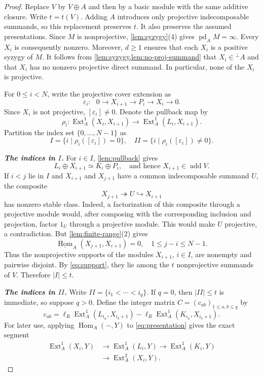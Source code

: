 \documentclass[a4paper,reqno]{amsart}
\numberwithin{equation}{section}
\theoremstyle{definition}
\DeclareMathOperator{\Ext}{Ext}
\DeclareMathOperator{\Hom}{Hom}
\DeclareMathOperator{\add}{add}
\DeclareMathOperator{\pd}{pd}
\newcommand{\stHom}{\underline{\Hom}}
\newcommand{\perpA}{{}^{\perp}A}
\newcommand{\len}{\ell_R}
\begin{document}
\begin{proof}
Replace $V$ by $V\oplus A$ and then by a basic module with the same additive closure. Write $t=t(V)$. Adding $A$ introduces only projective indecomposable summands, so this replacement preserves $t$. It also preserves the assumed presentations. Since $M$ is nonprojective, \cref{lem:syzygy}(4) gives $\pd_A M=\infty$. Every $X_i$ is consequently nonzero. Moreover, $d\geq1$ ensures that each $X_i$ is a positive syzygy of $M$. It follows from \cref{lem:syzygy,lem:no-proj-summand} that $X_i\in\perpA$ and that $X_i$ has no nonzero projective direct summand. In particular, none of the $X_i$ is projective.

For $0\leq i<N$, write the projective cover extension as
\begin{equation}\label{eq:cover}
\varepsilon_i\colon ~~~
0\longrightarrow X_{i+1}\longrightarrow P_i\longrightarrow X_i\longrightarrow0.
\end{equation}
Since $X_i$ is not projective, $[\varepsilon_i]\neq0$. Denote the pullback map by
\[
\rho_i:\Ext_A^1(X_i,X_{i+1})\longrightarrow\Ext_A^1(L_i,X_{i+1}).
\]
Partition the index set $\{0,\ldots,N-1\}$ as
\[
I=\{i\mid\rho_i([\varepsilon_i])=0\},\quad
II=\{i\mid\rho_i([\varepsilon_i])\neq0\}.
\]

\smallskip
\noindent\emph{\bf The indices in $I$.}
For $i\in I$, \cref{lem:pullback} gives
\begin{equation}\label{eq:support}
L_i\oplus X_{i+1}\simeq K_i\oplus P_i,
\quad\text{and hence }X_{i+1}\in\add V.
\end{equation}
If $i<j$ lie in $I$ and $X_{i+1}$ and $X_{j+1}$ have a common indecomposable summand $U$, the composite
\[
X_{j+1}\twoheadrightarrow U\hookrightarrow X_{i+1}
\]
has nonzero stable class. Indeed, a factorization of this composite through a projective module would, after composing with the corresponding inclusion and projection, factor $1_U$ through a projective module. This would make $U$ projective, a contradiction. But \cref{lem:finite-range}(2) gives
\[
\stHom_A(X_{j+1},X_{i+1})=0,
\quad 1\leq j-i\leq N-1.
\]
Thus the nonprojective supports of the modules $X_{i+1}$, $i\in I$, are nonempty and pairwise disjoint. By \eqref{eq:support}, they lie among the $t$ nonprojective summands of $V$. Therefore
$|I|\leq t.$

\smallskip
\noindent\emph{\bf The indices in $II$.}
Write $II=\{i_1<\cdots<i_q\}$. If $q=0$, then $|II|\leq t$ is immediate, so suppose $q>0$. Define the integer matrix $C=(c_{ab})_{1\leq a,b\leq q}$ by
\[
c_{ab}=\len\Ext_A^1(L_{i_a},X_{i_b+1})
-\len\Ext_A^1(K_{i_a},X_{i_b+1}).
\]
For later use, applying $\Hom_A(-,Y)$ to \eqref{eq:presentation} gives the exact segment
\begin{equation}\label{eq:ext-segment}
\begin{aligned}
\Ext_A^1(X_i,Y)&\longrightarrow\Ext_A^1(L_i,Y)
\longrightarrow\Ext_A^1(K_i,Y)\\
&\longrightarrow\Ext_A^2(X_i,Y).
\end{aligned}
\end{equation}


\end{proof}
\end{document}
